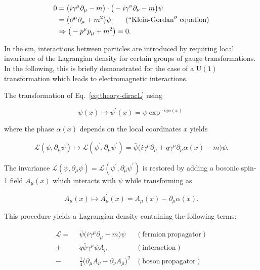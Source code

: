 \begin{align}
0&=\big(i\gamma^\mu\partial_\mu-m\big)\cdot \big(-i\gamma^\nu\partial_\nu-m\big)\psi\\
 &=\big(\partial^{\mu}\partial_{\mu}+m^{2}\big)\psi \qquad \mathrm{(``Klein\mbox{-}Gordan''~equation)}  \\
 &\Rightarrow \big(-p^{\mu}p_{\mu}+m^{2}\big) = 0.
\end{align}


In the \gls{sm}, interactions between particles are introduced by requiring local invariance of the Lagrangian density for certain groups of gauge transformations. In the following, this is briefly demonstrated for the case of a $\mathrm{U(1)}$ transformation which leads to electromagnetic interactions.

The transformation of Eq.~\ref{eq:theory-diracL} using 

\begin{equation}
\psi(x)\mapsto\psi^{\prime}(x)=\psi\exp^{-iq\alpha(x)}
\end{equation}

where the phase $\alpha(x)$ depends on the local coordinates $x$ yields

\begin{equation}
\mathcal{L}(\psi,\partial_\mu\psi)\mapsto\mathcal{L}(\psi^{\prime},\partial_\mu\psi^{\prime})=\bar{\psi}\big(i\gamma^\mu\partial_\mu+q\gamma^\mu\partial_\mu\alpha(x)-m\big)\psi.
\end{equation}

The invariance $\mathcal{L}(\psi,\partial_\mu\psi)=\mathcal{L}(\psi^{\prime},\partial_\mu\psi^{\prime})$ is restored by adding a bosonic spin-1 field $A_{\mu}(x)$ which interacts with $\psi$ while transforming as

\begin{equation}
A_{\mu}(x)\mapsto A^{\prime}_{\mu}(x)=A_\mu(x)-\partial_\mu\alpha(x).
\end{equation}

This procedure yields a Lagrangian density containing the following terms:

\begin{align}
\mathcal{L}=~~&\bar{\psi}\big(i\gamma^\mu\partial_\mu-m\big)\psi &(\mathrm{fermion~propagator}) \\
            +&q\bar{\psi}\gamma^{\mu}\psi A_{\mu} &(\mathrm{interaction}) \label{eq:theory-EM-int}\\
            -&\tfrac{1}{4}\big(\partial_\mu A_\nu-\partial_\nu A_\mu\big)^{2} &(\mathrm{boson~propagator})
\end{align}

